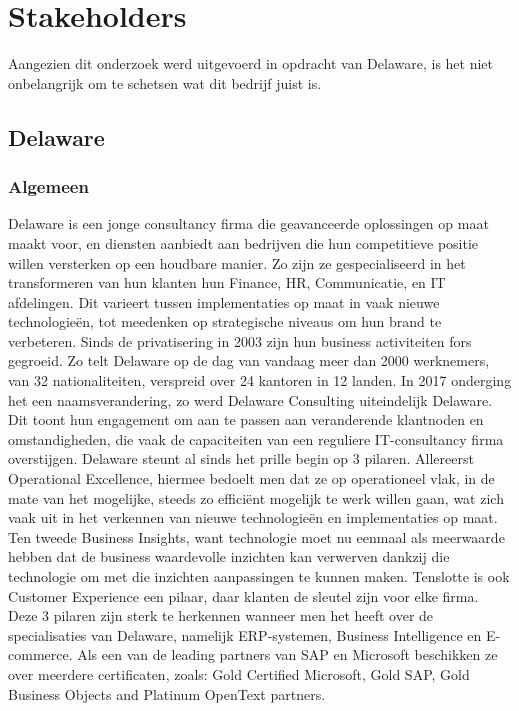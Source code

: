 
\chapter{Stakeholders}
\label{ch:conclusie}

Aangezien dit onderzoek werd uitgevoerd in opdracht van Delaware, is het niet onbelangrijk om te schetsen wat dit bedrijf juist is. 

\section{Delaware}
\subsection{Algemeen}
Delaware is een jonge consultancy firma die geavanceerde oplossingen op maat maakt voor, en diensten aanbiedt aan bedrijven die hun competitieve positie willen versterken op een houdbare manier. Zo zijn ze gespecialiseerd in het transformeren van hun klanten hun Finance, HR, Communicatie, en IT afdelingen. Dit varieert tussen implementaties op maat in vaak nieuwe technologieën, tot meedenken op strategische niveaus om hun brand te verbeteren. 
Sinds de privatisering in 2003 zijn hun business activiteiten fors gegroeid. Zo telt Delaware op de dag van vandaag meer dan 2000 werknemers, van 32 nationaliteiten, verspreid over 24 kantoren in 12 landen. In 2017 onderging het een naamsverandering, zo werd Delaware Consulting uiteindelijk Delaware. Dit toont hun engagement om aan te passen aan veranderende klantnoden en omstandigheden, die vaak de capaciteiten van een reguliere IT-consultancy firma overstijgen. 
Delaware steunt al sinds het prille begin op 3 pilaren. Allereerst Operational Excellence, hiermee bedoelt men dat ze op operationeel vlak, in de mate van het mogelijke, steeds zo efficiënt mogelijk te werk willen gaan, wat zich vaak uit in het verkennen van nieuwe technologieën en implementaties op maat. Ten tweede Business Insights, want technologie moet nu eenmaal als meerwaarde hebben dat de business waardevolle inzichten kan verwerven dankzij die technologie om met die inzichten aanpassingen te kunnen maken. Tenslotte is ook Customer Experience een pilaar, daar klanten de sleutel zijn voor elke firma. Deze 3 pilaren zijn sterk te herkennen wanneer men het heeft over de specialisaties van Delaware, namelijk ERP-systemen, Business Intelligence en E-commerce. 
Als een van de leading partners van SAP en Microsoft beschikken ze over meerdere certificaten, zoals: Gold Certified Microsoft, Gold SAP, Gold Business Objects and Platinum OpenText partners.

